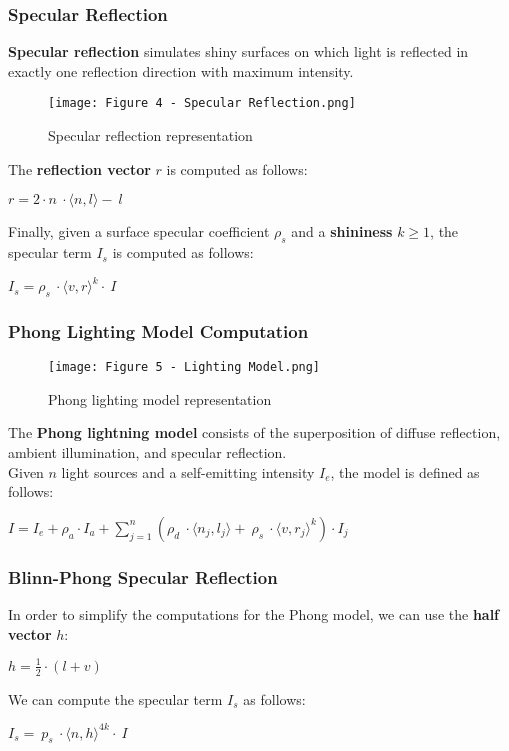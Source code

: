 \documentclass{article}
\begin{document}
\subsubsection{Specular Reflection}
\textbf{Specular reflection} simulates shiny surfaces on which light is reflected in exactly one reflection direction with maximum intensity.
\begin{figure}[H]
    \centering
    \texttt{[image: Figure 4 - Specular Reflection.png]}
    \caption{Specular reflection representation}
\end{figure}
\noindent
The \textbf{reflection vector} $ r $ is computed as follows:
\begin{center}
    $ r = 2 \cdot n \ \cdot \langle n,l\rangle - \ l $
\end{center}
Finally, given a surface specular coefficient $\rho_s$ and a \textbf{shininess} $k \geq 1$, the specular term $ I_s $ is computed as follows:
\begin{center}
    $ I_s = \rho_s \ \cdot \langle v,r\rangle^k \cdot \ I $
\end{center}
\subsubsection{Phong Lighting Model Computation}
\begin{figure}[H]
    \centering
    \texttt{[image: Figure 5 - Lighting Model.png]}
    \caption{Phong lighting model representation}
\end{figure}
The \textbf{Phong lightning model} consists of the superposition of diffuse reflection, ambient illumination, and specular reflection. \\
Given $n$ light sources and a self-emitting intensity $I_e$, the model is defined as follows:
\begin{center}
    $ I = I_e + \rho_a \cdot I_a + \displaystyle\sum^n_{j=1}(\rho_d \ \cdot \langle n_j,l_j\rangle + \ \rho_s \ \cdot \langle v,r_j\rangle^k) \cdot I_j  $
\end{center}
\newpage
\subsubsection{Blinn-Phong Specular Reflection}
In order to simplify the computations for the Phong model, we can use the \textbf{half vector} $ h $:
\begin{center}
    $ h = \displaystyle\frac{1}{2} \cdot (l + v) $
\end{center}
We can compute the specular term $I_s$ as follows:
\begin{center}
    $ I_s = \ p_s \ \cdot \langle n,h\rangle^{4k} \cdot \ I $ 
\end{center}
\end{document}
